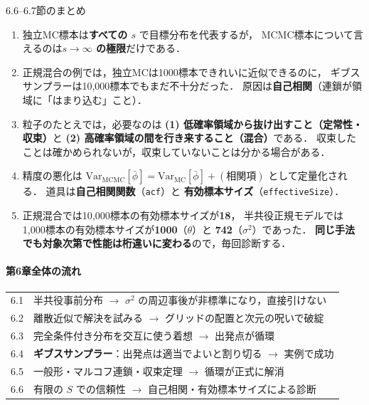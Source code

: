 \documentclass[lualatex,ja=standard,a4paper,12pt]{bxjsarticle}
\begin{document}
\begin{thmbox}{6.6--6.7節のまとめ}
\begin{enumerate}
  \item 独立MC標本は\textbf{すべての $s$} で目標分布を代表するが，
        MCMC標本について言えるのは\textbf{$s \to \infty$ の極限}だけである．

  \item 正規混合の例では，独立MCは1000標本できれいに近似できるのに，
        ギブスサンプラーは10,000標本でもまだ不十分だった．
        原因は\textbf{自己相関}（連鎖が領域に「はまり込む」こと）．

  \item 粒子のたとえでは，必要なのは
        \textbf{(1) 低確率領域から抜け出すこと（定常性・収束）}と
        \textbf{(2) 高確率領域の間を行き来すること（混合）}である．
        収束したことは確かめられないが，収束していないことは分かる場合がある．

  \item 精度の悪化は
        $\mathrm{Var}_{\mathrm{MCMC}}[\bar{\phi}]
        = \mathrm{Var}_{\mathrm{MC}}[\bar{\phi}] + (\text{相関項})$
        として定量化される．
        道具は\textbf{自己相関関数}（\texttt{acf}）と
        \textbf{有効標本サイズ}（\texttt{effectiveSize}）．

  \item 正規混合では10,000標本の有効標本サイズが\textbf{18}，
        半共役正規モデルでは1,000標本の有効標本サイズが\textbf{1000}（$\theta$）と
        \textbf{742}（$\sigma^2$）であった．
        \textbf{同じ手法でも対象次第で性能は桁違いに変わる}ので，毎回診断する．
\end{enumerate}
\end{thmbox}

\paragraph{第6章全体の流れ}
\begin{center}
\renewcommand{\arraystretch}{1.4}
\begin{tabular}{ll}
\toprule
6.1 & 半共役事前分布 $\to$ $\sigma^2$ の周辺事後が非標準になり，直接引けない \\
6.2 & 離散近似で解決を試みる $\to$ グリッドの配置と次元の呪いで破綻 \\
6.3 & 完全条件付き分布を交互に使う着想 $\to$ 出発点が循環 \\
6.4 & \textbf{ギブスサンプラー}：出発点は適当でよいと割り切る $\to$ 実例で成功 \\
6.5 & 一般形・マルコフ連鎖・収束定理 $\to$ 循環が正式に解消 \\
6.6 & 有限の $S$ での信頼性 $\to$ 自己相関・有効標本サイズによる診断 \\
\bottomrule
\end{tabular}
\end{center}
\end{document}
